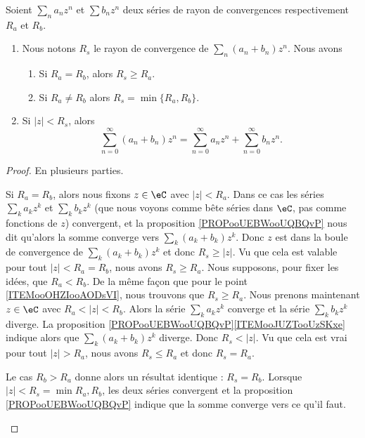 \begin{theorem}\label{THOooSDQQooIawBOk}
	Soient \( \sum_na_nz^n\) et \( \sum b_nz^n\) deux séries de rayon de convergences respectivement \( R_a\) et \( R_b\).
	\begin{enumerate}
		\item	\label{ITEMooJSIJooUSxIVk}
		      Nous notons \( R_s\) le rayon de convergence de \( \sum_n(a_n+b_n)z^n\). Nous avons
		      \begin{enumerate}
			      \item	\label{ITEMooOHZIooAODsVI}
			            Si \( R_a=R_b\), alors \( R_s\geq R_a\).
			      \item		\label{ITEMooBHUHooDAVNWJ}
			            Si \( R_a\neq R_b\) alors \( R_s=\min\{ R_a,R_b \}\).
		      \end{enumerate}
		\item	\label{ITEMooFJCKooZfYzXx}
		      Si \( | z |<R_s\), alors
		      \begin{equation}
			      \sum_{n=0}^{\infty}(a_n+b_n)z^n=\sum_{n=0}^{\infty}a_nz^n+\sum_{n=0}^{\infty}b_nz^n.
		      \end{equation}
	\end{enumerate}
\end{theorem}

\begin{proof}
	En plusieurs parties.
	\begin{subproof}
		Si \( R_a=R_b\), alors nous fixons \( z\in \eC\) avec \( | z |<R_a\). Dans ce cas les séries \( \sum_ka_kz^k\) et \( \sum_kb_kz^k\) (que nous voyons comme bête séries dans \( \eC\), pas comme fonctions de \( z\)) convergent, et la proposition \ref{PROPooUEBWooUQBQvP} nous dit qu'alors la somme converge vers \( \sum_{k}(a_k+b_k)z^k\). Donc \( z\) est dans la boule de convergence de \( \sum_k(a_k+b_k)z^k\) et donc \( R_s\geq | z |\). Vu que cela est valable pour tout \( | z |<R_a=R_b\), nous avons \( R_s\geq R_a\).
		Nous supposons, pour fixer les idées, que \( R_a<R_b\). De la même façon que pour le point \ref{ITEMooOHZIooAODsVI}, nous trouvons que \( R_s\geq R_a\). Nous prenons maintenant \( z\in \eC\) avec \( R_a<| z |<R_b\). Alors la série \( \sum_ka_kz^k\) converge et la série \( \sum_kb_kz^k\) diverge. La proposition \ref{PROPooUEBWooUQBQvP}\ref{ITEMooJUZTooUzSKxe} indique alors que \( \sum_k(a_k+b_k)z^k\) diverge. Donc \( R_s<| z |\). Vu que cela est vrai pour tout \( | z |>R_a\), nous avons \( R_s\leq R_a\) et donc \( R_s=R_a\).

		Le cas \( R_b>R_a\) donne alors un résultat identique : \( R_s=R_b\).
		Lorsque \( | z |<R_s=\min{R_a,R_b}\), les deux séries convergent et la proposition \ref{PROPooUEBWooUQBQvP} indique que la somme converge vers ce qu'il faut.
	\end{subproof}
\end{proof}

